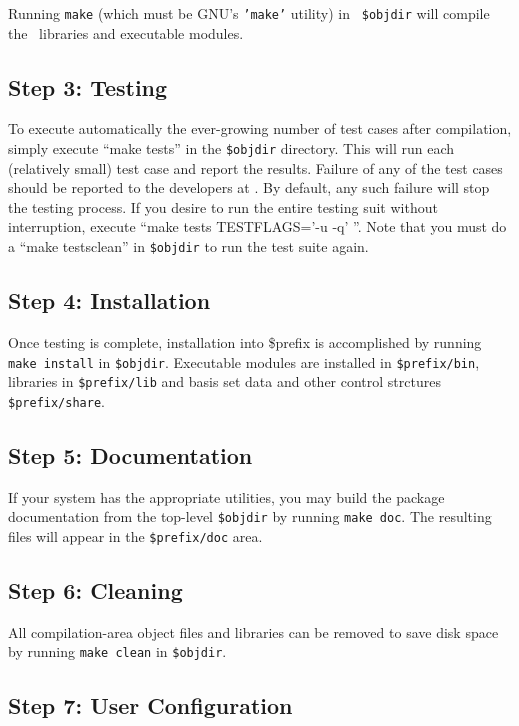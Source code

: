 \documentclass[12pt]{article}
\begin{document}
Running {\tt make} (which must be GNU's {\tt 'make'} utility) in {\tt
\$objdir} will compile the \PSIfour\ libraries and executable
modules.

\subsection{Step 3: Testing}

To execute automatically the ever-growing number of test cases after
compilation, simply execute ``make tests'' in the {\tt \$objdir}
directory.  This will run each (relatively small) test case and report
the results.  Failure of any of the test cases should be reported to
the developers at \PSIemail. By default, any such failure will stop
the testing process.  If you desire to run the entire testing suit
without interruption, execute ``make tests TESTFLAGS='-u -q' ''. Note
that you must do a ``make testsclean'' in {\tt \$objdir} to run the test
suite again.

\subsection{Step 4: Installation}

Once testing is complete, installation into \$prefix is accomplished by
running {\tt make install} in {\tt \$objdir}.   Executable modules are
installed in {\tt \$prefix/bin}, libraries in {\tt \$prefix/lib} and basis 
set data and other control strctures {\tt \$prefix/share}.

\subsection{Step 5: Documentation}

If your system has the appropriate utilities, you may build the package
documentation from the top-level {\tt \$objdir} by running {\tt make doc}.  
The resulting files will appear in the {\tt \$prefix/doc} area.

\subsection{Step 6: Cleaning}

All compilation-area object files and libraries can be removed to save
disk space by running {\tt make clean} in {\tt \$objdir}.

\subsection{Step 7: User Configuration}
\end{document}
